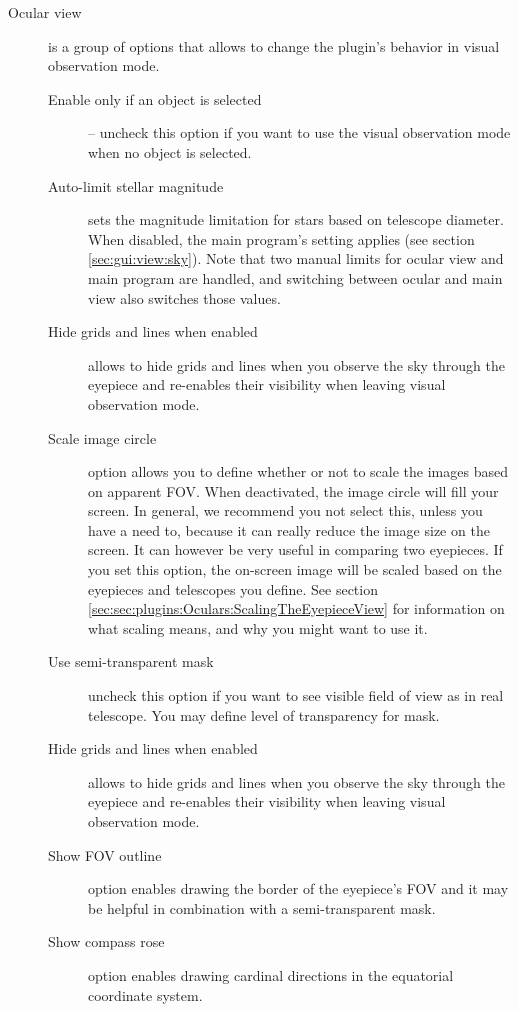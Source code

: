 \begin{description}
\begin{description}
 \end{description}
\item[Ocular view] is a group of options that allows to change the plugin's behavior in visual observation mode.
 \begin{description}
   \item[Enable only if an object is selected] -- uncheck this option if you want to use the visual observation mode when no object is selected.
   \item[Auto-limit stellar magnitude] sets the magnitude limitation
     for stars based on telescope diameter. When disabled, the main
     program's setting applies (see section
     \ref{sec:gui:view:sky}).  Note that two manual limits for ocular
     view and main program are handled, and switching between ocular
     and main view also switches those values.
   \item[Hide grids and lines when enabled] allows to hide grids and lines when you observe the sky through the eyepiece and re-enables their visibility when leaving visual observation mode.
   \item[Scale image circle] option allows you to define whether or not to scale the images based on apparent FOV. When deactivated, the image circle will fill your screen. 
         In general, we recommend you not select this, unless you have a need to, because it can really reduce the image size on the screen. 
		 It can however be very useful in comparing two eyepieces. 
		 If you set this option, the  on-screen image will be scaled based on the eyepieces and telescopes you define. 
		 See section \ref{sec:sec:plugins:Oculars:ScalingTheEyepieceView} for information on what scaling means, and why you might want to use it.
   \item[Use semi-transparent mask] uncheck this option if you want to see visible field of view as in real telescope. You may define level of transparency for mask.
   \item[Hide grids and lines when enabled] allows to hide grids and lines when you observe the sky through the eyepiece and re-enables their visibility when leaving visual observation mode.
   \item[Show FOV outline] option enables drawing the border of the eyepiece's FOV and it may be helpful in combination with a semi-transparent mask.
   \item[Show compass rose] option enables drawing cardinal directions in the equatorial coordinate system.

\end{description}
\end{description}
